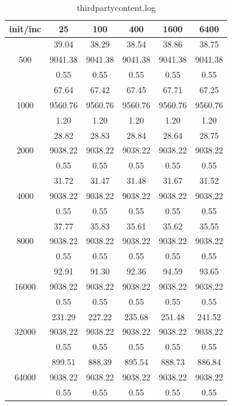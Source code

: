 {\begin{table}[th]
\caption{thirdpartycontent.log}
\label{tab:thirdpartycontent.log}
\centering
\begin{tabular}{|c||c|c|c|c|c|}
\hline
init/inc & 25 & 100 & 400 & 1600 & 6400 \\ \hline \hline
  & 39.04 & 38.29 & 38.54 & 38.86 & 38.75\\ 
500  & 9041.38 & 9041.38 & 9041.38 & 9041.38 & 9041.38\\ 
  & 0.55 & 0.55 & 0.55 & 0.55 & 0.55\\ \hline 
  & 67.64 & 67.42 & 67.45 & 67.71 & 67.25\\ 
1000  & 9560.76 & 9560.76 & 9560.76 & 9560.76 & 9560.76\\ 
  & 1.20 & 1.20 & 1.20 & 1.20 & 1.20\\ \hline 
  & 28.82 & 28.83 & 28.84 & 28.64 & 28.75\\ 
2000  & 9038.22 & 9038.22 & 9038.22 & 9038.22 & 9038.22\\ 
  & 0.55 & 0.55 & 0.55 & 0.55 & 0.55\\ \hline 
  & 31.72 & 31.47 & 31.48 & 31.67 & 31.52\\ 
4000  & 9038.22 & 9038.22 & 9038.22 & 9038.22 & 9038.22\\ 
  & 0.55 & 0.55 & 0.55 & 0.55 & 0.55\\ \hline 
  & 37.77 & 35.83 & 35.61 & 35.62 & 35.55\\ 
8000  & 9038.22 & 9038.22 & 9038.22 & 9038.22 & 9038.22\\ 
  & 0.55 & 0.55 & 0.55 & 0.55 & 0.55\\ \hline 
  & 92.91 & 91.30 & 92.36 & 94.59 & 93.65\\ 
16000  & 9038.22 & 9038.22 & 9038.22 & 9038.22 & 9038.22\\ 
  & 0.55 & 0.55 & 0.55 & 0.55 & 0.55\\ \hline 
  & 231.29 & 227.22 & 235.68 & 251.48 & 241.52\\ 
32000  & 9038.22 & 9038.22 & 9038.22 & 9038.22 & 9038.22\\ 
  & 0.55 & 0.55 & 0.55 & 0.55 & 0.55\\ \hline 
  & 899.51 & 888.39 & 895.54 & 888.73 & 886.84\\ 
64000  & 9038.22 & 9038.22 & 9038.22 & 9038.22 & 9038.22\\ 
  & 0.55 & 0.55 & 0.55 & 0.55 & 0.55\\ \hline 
\end{tabular}
\end{table}


}
